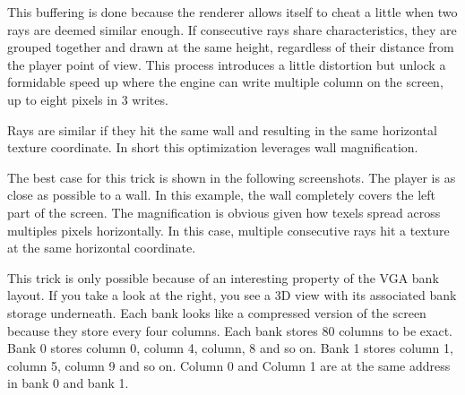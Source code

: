 \par
This buffering is done because the renderer allows itself to cheat a little when two rays are deemed similar enough. If consecutive rays share characteristics, they are grouped together and drawn at the same height, regardless of their distance from the player point of view. This process introduces a little distortion but unlock a formidable speed up where the engine can write multiple column on the screen, up to eight pixels in 3 writes.\\
\par
Rays are similar if they hit the same wall and resulting in the same  horizontal texture coordinate. In short this optimization leverages wall magnification.\\

\par
The best case for this trick is shown in the following screenshots. The player is as close as possible to a wall. In this example, the wall completely covers the left part of the screen. The magnification is obvious given how texels spread across multiples pixels horizontally. In this case, multiple consecutive rays hit a texture at the same horizontal coordinate.\\
\begin{figure}[H]
 \centering
\end{figure}

This trick is only possible because of an interesting property of the VGA bank layout. If you take a look at the right, you see a 3D view with its associated bank storage underneath. Each bank looks like a compressed version of the screen because they store every four columns. Each bank stores 80 columns to be exact. Bank 0 stores column 0, column 4, column, 8 and so on. Bank 1 stores column 1, column 5, column 9 and so on. Column 0 and Column 1 are at the same address in bank 0 and bank 1.
 \par
  \begin{minipage}{\textwidth}
 
\centering
\vspace*{0.5cm}
\centering


 \end{minipage}

\par

